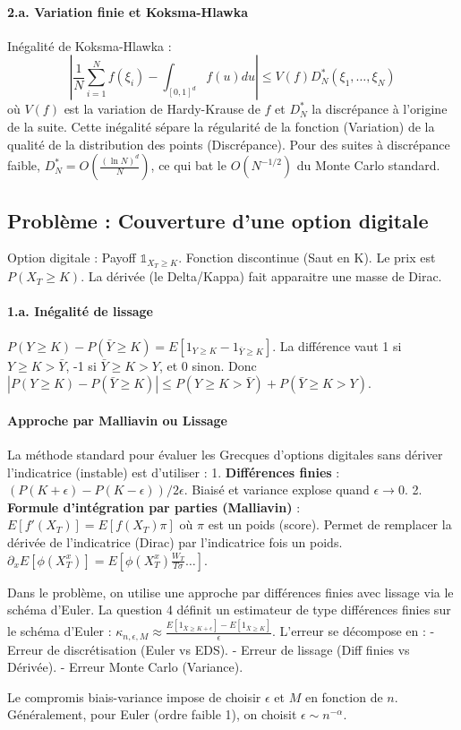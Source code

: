 \documentclass[a4paper,11pt]{article}
\begin{document}
\paragraph{2.a. Variation finie et Koksma-Hlawka}
Inégalité de Koksma-Hlawka :
\[ |\frac{1}{N} \sum_{i=1}^N f(\xi_i) - \int_{[0,1]^d} f(u) du| \le V(f) D_N^*(\xi_1, \dots, \xi_N) \]
où $V(f)$ est la variation de Hardy-Krause de $f$ et $D_N^*$ la discrépance à l'origine de la suite.
Cette inégalité sépare la régularité de la fonction (Variation) de la qualité de la distribution des points (Discrépance).
Pour des suites à discrépance faible, $D_N^* = O(\frac{(\ln N)^d}{N})$, ce qui bat le $O(N^{-1/2})$ du Monte Carlo standard.

\subsection{Problème : Couverture d'une option digitale}
Option digitale : Payoff $\mathbb{1}_{X_T \ge K}$.
Fonction discontinue (Saut en K).
Le prix est $P(X_T \ge K)$. La dérivée (le Delta/Kappa) fait apparaitre une masse de Dirac.

\paragraph{1.a. Inégalité de lissage}
$P(Y \ge K) - P(\bar{Y} \ge K) = E[1_{Y \ge K} - 1_{\bar{Y} \ge K}]$.
La différence vaut 1 si $Y \ge K > \bar{Y}$, -1 si $\bar{Y} \ge K > Y$, et 0 sinon.
Donc $|P(Y \ge K) - P(\bar{Y} \ge K)| \le P(Y \ge K > \bar{Y}) + P(\bar{Y} \ge K > Y)$.

\paragraph{Approche par Malliavin ou Lissage}
La méthode standard pour évaluer les Grecques d'options digitales sans dériver l'indicatrice (instable) est d'utiliser :
1. \textbf{Différences finies} : $(P(K+\epsilon) - P(K-\epsilon))/2\epsilon$. Biaisé et variance explose quand $\epsilon \to 0$.
2. \textbf{Formule d'intégration par parties (Malliavin)} : $E[f'(X_T)] = E[f(X_T) \pi]$ où $\pi$ est un poids (score). Permet de remplacer la dérivée de l'indicatrice (Dirac) par l'indicatrice fois un poids.
$ \partial_x E[\phi(X_T^x)] = E[\phi(X_T^x) \frac{W_T}{T \sigma} \dots] $.

Dans le problème, on utilise une approche par différences finies avec lissage via le schéma d'Euler.
La question 4 définit un estimateur de type différences finies sur le schéma d'Euler :
$\kappa_{n, \epsilon, M} \approx \frac{E[1_{\bar{X} \ge K+\epsilon}] - E[1_{\bar{X} \ge K}]}{\epsilon}$.
L'erreur se décompose en :
- Erreur de discrétisation (Euler vs EDS).
- Erreur de lissage (Diff finies vs Dérivée).
- Erreur Monte Carlo (Variance).

Le compromis biais-variance impose de choisir $\epsilon$ et $M$ en fonction de $n$.
Généralement, pour Euler (ordre faible 1), on choisit $\epsilon \sim n^{-\alpha}$.
\end{document}
